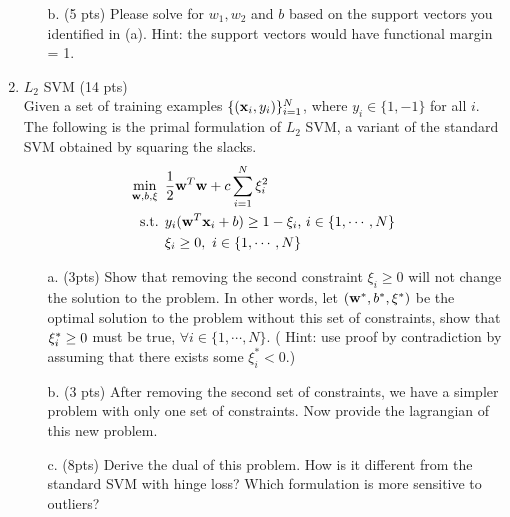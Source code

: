 \documentclass{article}
\def\x{{\bf x}}
\def\w{{\bf w}}
\begin{document}
\begin{enumerate}
\begin{itemize}
\item[b.] (5 pts) Please solve for $w_1, w_2$ and $b$ based on the support vectors you identified in (a). Hint: the support vectors would have functional margin = 1. \\
\end{itemize}
\item $L_2$ SVM (14 pts) \\
Given a set of training examples $\{(\x_i, y_i)\}_{i=1}^N$, where $y_i\in \{1, -1\}$ for all $i$. The following is the primal formulation of $L_2$ SVM, a variant of the standard SVM obtained by squaring the slacks.
\begin{align*}
\min_{\w, b, \xi} \mbox{ }& \frac{1}{2}\w^T\w+c\sum_{i=1}^N \xi_i^2 \\
\mbox{s.t. } & y_i(\w^T\x_i+b)\geq 1-\xi_i \mbox{,   } i \in \{1,\cdots,N\}\\
 & \xi_i\geq 0, \mbox{  }  i\in \{1,\cdots,N\}
\end{align*}

\begin{itemize}
\item [a.] (3pts) Show that removing the second constraint $\xi_i\geq 0$ will not change the solution to the problem. In other words, let $(\w^*, b^*, {\bf \xi}^*)$ be the optimal solution to the problem without this set of constraints, show that ${\bf \xi}_i^* \geq 0$ must be true, $\forall i\in\{1,\cdots,N\} $. ( Hint: use proof by contradiction by assuming that there exists some $\xi_i^*<0$.)\\
\item [b.] (3 pts) After removing the second set of constraints, we have a simpler problem with only one set of constraints. Now provide the lagrangian of this new problem.\\
\item [c.] (8pts) Derive the dual of this problem. How is it different from the standard SVM with hinge loss? Which formulation is more sensitive to outliers?\\

\end{itemize}
\end{enumerate}
\end{document}
